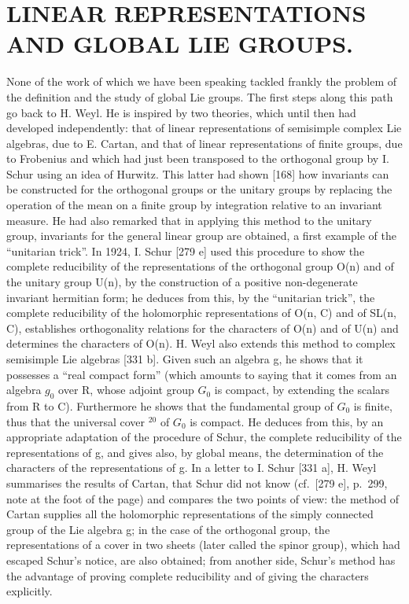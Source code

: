 \section{LINEAR REPRESENTATIONS AND GLOBAL LIE GROUPS.}

None of the work of which we have been speaking tackled frankly the problem of the definition and the study of global Lie groups. The first steps along this path go back to H. Weyl. He is inspired by two theories, which until then had developed independently: that of linear representations of semisimple complex Lie algebras, due to E. Cartan, and that of linear representations of finite groups, due to Frobenius and which had just been transposed to the orthogonal group by I. Schur using an idea of Hurwitz. This latter had shown {[}168{]} how invariants can be constructed for the orthogonal groups or the unitary groups by replacing the operation of the mean on a finite group by integration relative to an invariant measure. He had also remarked that in applying this method to the unitary group, invariants for the general linear group are obtained, a first example of the ``unitarian trick''. In 1924, I. Schur {[}279 e{]} used this procedure to show the complete reducibility of the representations of the orthogonal group O(n) and of the unitary group U(n), by the construction of a positive non-degenerate invariant hermitian form; he deduces from this, by the ``unitarian trick'', the complete reducibility of the holomorphic representations of O(n, C) and of SL(n, C), establishes orthogonality relations for the characters of O(n) and of U(n) and determines the characters of O(n). H. Weyl also extends this method to complex semisimple Lie algebras {[}331 b{]}. Given such an algebra g, he shows that it possesses a ``real compact form'' (which amounts to saying that it comes from an algebra \(g_{0}\) over R, whose adjoint group \(G_{0}\) is compact, by extending the scalars from R to C). Furthermore he shows that the fundamental group of \(G_{0}\) is finite, thus that the universal cover \(^{20}\) of \(G_{0}\) is compact. He deduces from this, by an appropriate adaptation of the procedure of Schur, the complete reducibility of the representations of g, and gives also, by global means, the determination of the characters of the representations of g. In a letter to I. Schur {[}331 a{]}, H. Weyl summarises the results of Cartan, that Schur did not know (cf.~{[}279 e{]}, p.~299, note at the foot of the page) and compares the two points of view: the method of Cartan supplies all the holomorphic representations of the simply connected group of the Lie algebra g; in the case of the orthogonal group, the representations of a cover in two sheets (later called the spinor group), which had escaped Schur's notice, are also obtained; from another side, Schur's method has the advantage of proving complete reducibility and of giving the characters explicitly.

